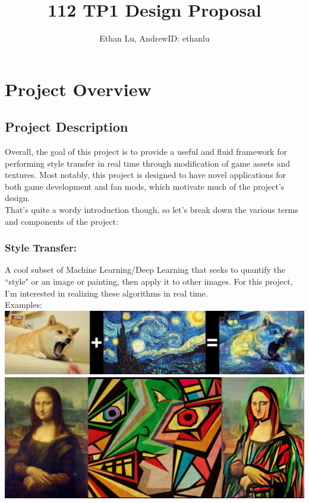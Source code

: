 \documentclass[12pt]{article}
\begin{document}
\title{112 TP1 Design Proposal}
\author{Ethan Lu, AndrewID: ethanlu}
\maketitle
\section{Project Overview}

\subsection{Project Description}
    Overall, the goal of this project is to provide a useful and fluid framework for performing style transfer in real time through modification of game assets and textures. 
    Most notably, this project is designed to have novel applications for both game development and fan mods, which motivate much of the project's design. \\
    That's quite a wordy introduction though, so let's break down the various terms and components of the project:

    \subsubsection{Style Transfer:}
    A cool subset of Machine Learning/Deep Learning that seeks to quantify the ``style" or an image or painting, then apply it to other images. 
    For this project, I'm interested in realizing these algorithms in real time.\\
    Examples: \\
    \includegraphics[width=\columnwidth]{ex1.jpg}\\
    \includegraphics[width=\columnwidth]{ex2.png}
\end{document}
